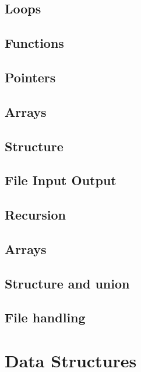 \documentclass[12pt, a4paper]{report}
\begin{document}
    \section{Loops}
    
    \clearpage

    \section{Functions}
    
    \clearpage  

    \section{Pointers}
    
    \clearpage      

    \section{Arrays}
    
    \clearpage    

    
    \section{Structure}
    
    \clearpage    

    
    \section{File Input Output}
    
    \clearpage    


    \iffalse
    \section{Recursion}
    \section{Arrays}
    \section{Structure and union}
    \section{File handling}


    \chapter{Data Structures}    
\end{document}

